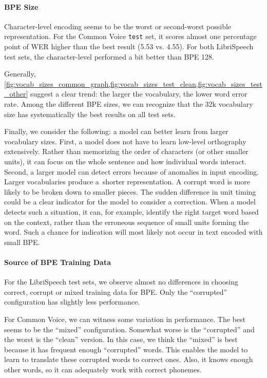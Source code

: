 \paragraph{BPE Size}
Character-level encoding seems to be the worst or second-worst possible representation. For the Common Voice \texttt{test} set, it scores almost one percentage point of WER higher than the best result (5.53 vs. 4.55). For both LibriSpeech test sets, the character-level performed a bit better than BPE 128. 

Generally, \cref{fig:vocab_sizes_common_graph,fig:vocab_sizes_test_clean,fig:vocab_sizes_test_other} suggest a clear trend: the larger the vocabulary, the lower word error rate. Among the different BPE sizes, we can recognize that the 32k vocabulary size has systematically the best results on all test sets.

Finally, we consider the following: a model can better learn from larger vocabulary sizes. First, a model does not have to learn low-level orthography extensively. Rather than memorizing the order of characters (or other smaller units), it can focus on the whole sentence and how individual words interact. Second, a larger model can detect errors because of anomalies in input encoding. Larger vocabularies produce a~shorter representation. A corrupt word is more likely to be broken down to smaller pieces. The sudden difference in unit timing could be a clear indicator for the model to consider a correction. When a model detects such a situation, it can, for example, identify the right target word based on the context, rather than the erroneous sequence of small units forming the word. Such a chance for indication will most likely not occur in text encoded with small BPE.

\paragraph{Source of BPE Training Data}
For the LibriSpeech test sets, we observe almost no differences in choosing correct, corrupt or mixed training data for BPE. Only the ``corrupted'' configuration has slightly less performance. 

For Common Voice, we can witness some variation in performance. The best seems to be the ``mixed'' configuration. Somewhat worse is the ``corrupted'' and the worst is the ``clean'' version. In this case, we think the ``mixed'' is best because it has frequent enough ``corrupted'' words. This enables the model to learn to translate these corrupted words to correct ones. Also, it knows enough other words, so it can adequately work with correct phonemes.

